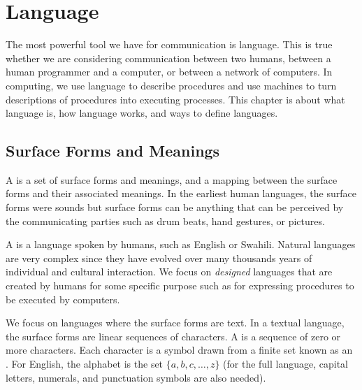 \chapter{Language}\label{ch:language}



The most powerful tool we have for communication is language.  This is true whether we are considering communication between two humans, between a human programmer and a computer, or between a network of computers.  In computing, we use language to describe procedures and use machines to turn descriptions of procedures into executing processes.  This chapter is about what language is, how language works, and ways to define languages.

\section{Surface Forms and Meanings}\label{sec:surfaceforms}

A  is a set of surface forms and meanings, and a mapping between the surface forms and their associated meanings.  In the earliest human languages, the surface forms were sounds but surface forms can be anything that can be perceived by the communicating parties such as drum beats, hand gestures, or pictures.  

   
A  is a language spoken by humans, such as English or Swahili.   Natural languages are very complex since they have evolved over many thousands years of individual and cultural interaction.  We focus on \emph{designed} languages that are created by humans for some specific purpose such as for expressing procedures to be executed by computers.

We focus on languages where the surface forms are text.  In a textual language, the surface forms are linear sequences of characters.  A  is a sequence of zero or more characters.  Each character is a symbol drawn from a finite set known as an .  For English, the alphabet is the set $\{ a, b, c, \ldots, z \}$ (for the full language, capital letters, numerals, and punctuation symbols are also needed).  

